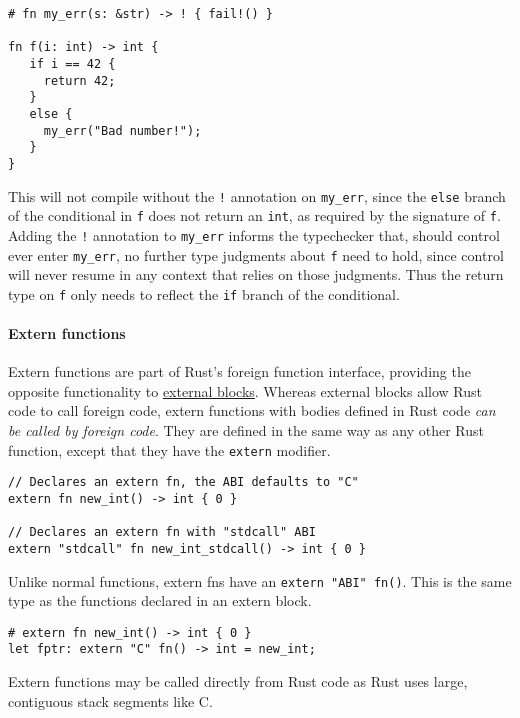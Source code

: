 \documentclass[]{article}
\begin{document}
\begin{verbatim}
# fn my_err(s: &str) -> ! { fail!() }

fn f(i: int) -> int {
   if i == 42 {
     return 42;
   }
   else {
     my_err("Bad number!");
   }
}
\end{verbatim}

This will not compile without the \texttt{!} annotation on
\texttt{my\_err}, since the \texttt{else} branch of the conditional in
\texttt{f} does not return an \texttt{int}, as required by the signature
of \texttt{f}. Adding the \texttt{!} annotation to \texttt{my\_err}
informs the typechecker that, should control ever enter
\texttt{my\_err}, no further type judgments about \texttt{f} need to
hold, since control will never resume in any context that relies on
those judgments. Thus the return type on \texttt{f} only needs to
reflect the \texttt{if} branch of the conditional.

\paragraph{Extern functions}\label{extern-functions}

Extern functions are part of Rust's foreign function interface,
providing the opposite functionality to
\hyperref[external-blocks]{external blocks}. Whereas external blocks
allow Rust code to call foreign code, extern functions with bodies
defined in Rust code \emph{can be called by foreign code}. They are
defined in the same way as any other Rust function, except that they
have the \texttt{extern} modifier.

\begin{verbatim}
// Declares an extern fn, the ABI defaults to "C"
extern fn new_int() -> int { 0 }

// Declares an extern fn with "stdcall" ABI
extern "stdcall" fn new_int_stdcall() -> int { 0 }
\end{verbatim}

Unlike normal functions, extern fns have an \texttt{extern "ABI" fn()}.
This is the same type as the functions declared in an extern block.

\begin{verbatim}
# extern fn new_int() -> int { 0 }
let fptr: extern "C" fn() -> int = new_int;
\end{verbatim}

Extern functions may be called directly from Rust code as Rust uses
large, contiguous stack segments like C.
\end{document}
